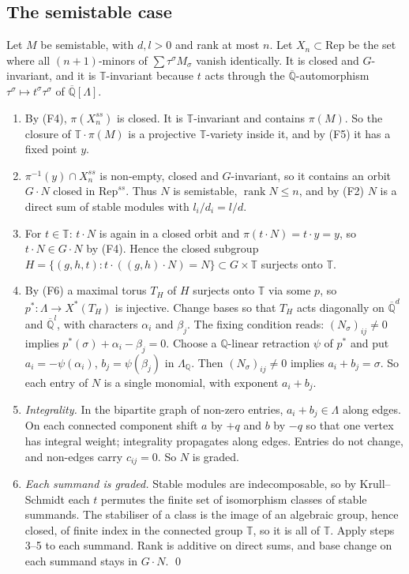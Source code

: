 \documentclass[11pt,a4paper]{article}
\theoremstyle{plain}
\theoremstyle{definition}
\newcommand{\Q}{\mathbb{Q}}
\newcommand{\Qbar}{\overline{\mathbb{Q}}}
\newcommand{\rk}{\operatorname{rank}}
\newcommand{\Tor}{\mathbb{T}}
\newcommand{\Rep}{\mathrm{Rep}}
\begin{document}
\subsection{The semistable case}\label{sec:semistable}

Let $M$ be semistable, with $d,l>0$ and rank at most $n$. Let $X_{n}\subset\Rep$ be the set where all $(n+1)$-minors of $\sum\tau^{\sigma}M_{\sigma}$ vanish identically. It is closed and $G$-invariant,
and it is $\Tor$-invariant because $t$ acts through the $\Qbar$-automorphism $\tau^{\sigma}\mapsto t^{\sigma}\tau^{\sigma}$ of $\Qbar[\Lambda]$.

\begin{enumerate}[label=\arabic*.]
\item By (F4), $\pi(X_{n}^{ss})$ is closed. It is $\Tor$-invariant and contains $\pi(M)$. So the closure of $\Tor\cdot\pi(M)$ is a projective $\Tor$-variety inside it, and by (F5) it has a fixed point $y$.
\item $\pi^{-1}(y)\cap X_{n}^{ss}$ is non-empty, closed and $G$-invariant, so it contains an orbit $G\cdot N$ closed in $\Rep^{ss}$. Thus $N$ is semistable, $\rk N\le n$, and by (F2) $N$ is a direct
sum of stable modules with $l_{i}/d_{i}=l/d$.
\item For $t\in\Tor$: $t\cdot N$ is again in a closed orbit and $\pi(t\cdot N)=t\cdot y=y$, so $t\cdot N\in G\cdot N$ by (F4). Hence the closed subgroup
$H=\{(g,h,t):t\cdot((g,h)\cdot N)=N\}\subset G\times\Tor$ surjects onto $\Tor$.
\item By (F6) a maximal torus $T_{H}$ of $H$ surjects onto $\Tor$ via some $p$, so $p^{*}:\Lambda\to X^{*}(T_{H})$ is injective. Change bases so that $T_{H}$ acts diagonally on $\Qbar^{d}$ and $\Qbar^{l}$, with
characters $\alpha_{i}$ and $\beta_{j}$. The fixing condition reads: $(N_{\sigma})_{ij}\neq0$ implies $p^{*}(\sigma)+\alpha_{i}-\beta_{j}=0$. Choose a $\Q$-linear retraction $\psi$ of $p^{*}$ and put
$a_{i}=-\psi(\alpha_{i})$, $b_{j}=\psi(\beta_{j})$ in $\Lambda_{\Q}$. Then $(N_{\sigma})_{ij}\neq0$ implies $a_{i}+b_{j}=\sigma$. So each entry of $N$ is a single monomial, with exponent $a_{i}+b_{j}$.
\item \emph{Integrality.} In the bipartite graph of non-zero entries, $a_{i}+b_{j}\in\Lambda$ along edges. On each connected component shift $a$ by $+q$ and $b$ by $-q$ so that one vertex has integral
weight; integrality propagates along edges. Entries do not change, and non-edges carry $c_{ij}=0$. So $N$ is graded.
\item \emph{Each summand is graded.} Stable modules are indecomposable, so by Krull--Schmidt each $t$ permutes the finite set of isomorphism classes of stable summands. The stabiliser of a class is
the image of an algebraic group, hence closed, of finite index in the connected group $\Tor$, so it is all of $\Tor$. Apply steps 3--5 to each summand. Rank is additive on direct sums, and
base change on each summand stays in $G\cdot N$. \qed
\end{enumerate}
\end{document}
